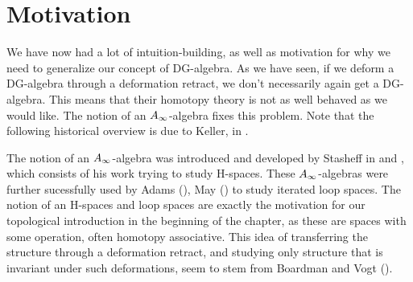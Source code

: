 






\section{Motivation}

We have now had a lot of intuition-building, as well as motivation for why we need to generalize our concept of DG-algebra. As we have seen, if we deform a DG-algebra through a deformation retract, we don't necessarily again get a DG-algebra. This means that their homotopy theory is not as well behaved as we would like. The notion of an $A_{\infty}$-algebra fixes this problem. Note that the following historical overview is due to Keller, in \cite{keller}.

The notion of an $A_{\infty}$-algebra was introduced and developed by Stasheff in \cite{h-spaces1} and \cite{h-spaces2}, which consists of his work trying to study H-spaces. These $A_{\infty}$-algebras were further sucessfully used by Adams (\cite{adams_loop}), May (\cite{may_loop}) to study iterated loop spaces. The notion of an H-spaces and loop spaces are exactly the motivation for our topological introduction in the beginning of the chapter, as these are spaces with some operation, often homotopy associative. This idea of transferring the structure through a deformation retract, and studying only structure that is invariant under such deformations, seem to stem from Boardman and Vogt (\cite{boardman_vogt}). 

